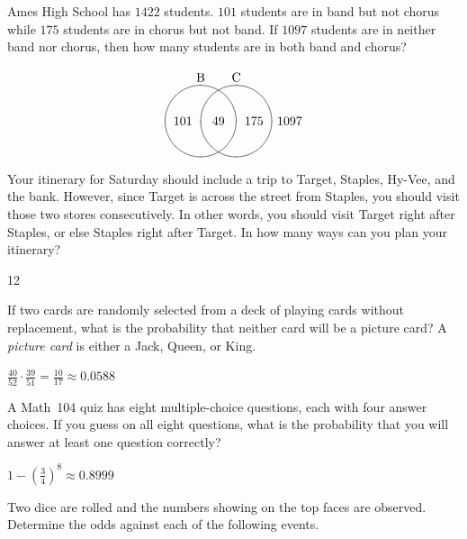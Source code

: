 \documentclass[answers,addpoints,12pt]{exam}
\begin{document}
\begin{questions}

\question[12] Ames High School has $1422$ students.
$101$ students are in band but not chorus while
$175$ students are in chorus but not band.
If $1097$ students are in neither band nor chorus,
then how many students are in both band and chorus?
\begin{solution}
\[\begin{xy}<.5cm,0cm>:
(-1,2)*+!D{\text{B}};
(1,2)*+!D{\text{C}};
(-1,0)*\cir<1cm>{};
(1,0)*\cir<1cm>{};
(0,0)*{49};
(-2,0)*{101};
(2,0)*{175};
(4,0)*{1097};
\end{xy}\]
\end{solution}

\question[15] Your itinerary for Saturday should
include a trip to Target, Staples, Hy-Vee, and the bank.
However, since Target is across the street from Staples,
you should visit those two stores consecutively. In other
words, you should visit Target right after Staples, or else
Staples right after Target. In how many ways
can you plan your itinerary?
\begin{solution}12\end{solution}

\question[10] If two cards are randomly selected from a deck
of playing cards without replacement, what is the probability that neither card
will be a picture card? A {\em picture card} is either a Jack, Queen, or King.
\begin{solution}
$\frac{40}{52}\cdot\frac{39}{51}=\frac{10}{17}\approx 0.0588$
\end{solution}

\question[12] A Math~104 quiz has eight multiple-choice
questions, each with four answer choices. If you guess on all
eight questions, what is the probability that you will answer at
least one question correctly?
\begin{solution}
$1-\left(\frac{3}{4}\right)^8\approx 0.8999$
\end{solution}

\question[16] Two dice are rolled and the
numbers showing on the top faces are observed.
Determine the odds against each of the following events.
\end{questions}
\end{document}

